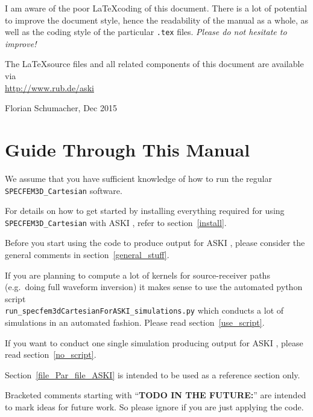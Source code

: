 \documentclass[12pt,a4paper]{article}
\newcommand{\lcode}[1]{\nolinkurl{#1}}
\newcommand{\ASKI}{ {\ttfamily ASKI} }
\begin{document}
I am aware of the poor \LaTeX coding of this document. There is a lot of potential
to improve the document 
style, hence the readability of the manual as a whole, as well as the coding style of the 
particular \lcode{.tex} files. \emph{Please do not hesitate to improve!}

The \LaTeX source files and all related components of this document are available via\\
\url{http://www.rub.de/aski}
\begin{flushright}
Florian Schumacher, Dec 2015
\end{flushright}

\newpage
%
\section*{Guide Through This Manual}
%
We assume that you have sufficient knowledge of how to run the regular \lcode{SPECFEM3D_Cartesian} software.

For details on how to get started by installing everything required for using \lcode{SPECFEM3D_Cartesian} 
with \ASKI, refer to section~\ref{install}{}. 

Before you start using the code to produce output for \ASKI, please consider the general
comments in section~\ref{general_stuff}.

If you are planning to compute a lot of kernels for source-receiver paths (e.g.\ doing full waveform inversion) 
it makes sense to use the automated python script \\ \lcode{run_specfem3dCartesianForASKI_simulations.py} 
which conducts a lot of simulations in an automated fashion. Please read section~\ref{use_script}. 

If you want to conduct one single simulation producing output for \ASKI, please 
read section~\ref{no_script}.

Section~\ref{file_Par_file_ASKI} is intended to be used as a reference section only.

Bracketed comments starting with ``{\bf TODO IN THE FUTURE:}'' are intended to mark ideas for future work. 
So please ignore if you are just applying the code.
%
\newpage
\tableofcontents
\newpage
%
\end{document}
